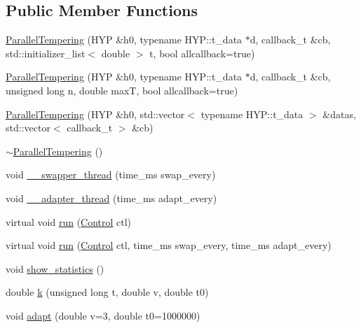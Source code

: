 \subsection*{Public Member Functions}
\begin{DoxyCompactItemize}
\item 
\hyperlink{class_parallel_tempering_abac520918d0d6915c61d9595a82b01eb}{Parallel\+Tempering} (H\+YP \&h0, typename H\+Y\+P\+::t\+\_\+data $\ast$d, callback\+\_\+t \&cb, std\+::initializer\+\_\+list$<$ double $>$ t, bool allcallback=true)
\item 
\hyperlink{class_parallel_tempering_a6318b222a7fbc7148ce82d0bbc5a3ecd}{Parallel\+Tempering} (H\+YP \&h0, typename H\+Y\+P\+::t\+\_\+data $\ast$d, callback\+\_\+t \&cb, unsigned long n, double maxT, bool allcallback=true)
\item 
\hyperlink{class_parallel_tempering_ad4b72862bcc821fe725ac2248c150898}{Parallel\+Tempering} (H\+YP \&h0, std\+::vector$<$ typename H\+Y\+P\+::t\+\_\+data $>$ \&datas, std\+::vector$<$ callback\+\_\+t $>$ \&cb)
\item 
\hyperlink{class_parallel_tempering_a96763c107a95f4a120f2b65c896cb5b2}{$\sim$\+Parallel\+Tempering} ()
\item 
void \hyperlink{class_parallel_tempering_aa704d462a41cb45b461b967a97dedcbb}{\+\_\+\+\_\+swapper\+\_\+thread} (time\+\_\+ms swap\+\_\+every)
\item 
void \hyperlink{class_parallel_tempering_a6ae6bd8581ec13aad5983886b1a739e6}{\+\_\+\+\_\+adapter\+\_\+thread} (time\+\_\+ms adapt\+\_\+every)
\item 
virtual void \hyperlink{class_parallel_tempering_ab244166aa3c7abf2a67b9cd8ca45f844}{run} (\hyperlink{struct_control}{Control} ctl)
\item 
virtual void \hyperlink{class_parallel_tempering_a40df4781b1d06acff7b0902c4d4a5a87}{run} (\hyperlink{struct_control}{Control} ctl, time\+\_\+ms swap\+\_\+every, time\+\_\+ms adapt\+\_\+every)
\item 
void \hyperlink{class_parallel_tempering_a9e1960158b12a4dadfab54eb4fb895d3}{show\+\_\+statistics} ()
\item 
double \hyperlink{class_parallel_tempering_a439c50d3f616319803d4ab83804d1ae0}{k} (unsigned long t, double v, double t0)
\item 
void \hyperlink{class_parallel_tempering_a673feff316b65cad63f56ceb81b128ae}{adapt} (double v=3, double t0=1000000)
\end{DoxyCompactItemize}
